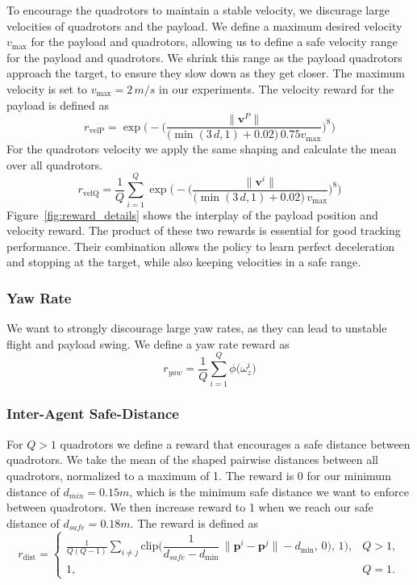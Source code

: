 To encourage the quadrotors to maintain a stable velocity, we discurage large velocities of quadrotors and the payload. We define a maximum desired velocity $v_{\max}$ for the payload and quadrotors, allowing us to define a safe velocity range for the payload and quadrotors. We shrink this range as the payload quadrotors approach the target, to ensure they slow down as they get closer. The maximum velocity is set to $v_{\max}=2\,m/s$ in our experiments. The velocity reward for the payload is defined as
\begin{equation}
r_{\mathrm{velP}}
= \exp\!\Biggl(-\biggl(\frac{\lVert \mathbf{v}^P\rVert}{\bigl(\min(3\,d,1)+0.02\bigr)\,0.75v_{\max}}\biggr)^{8}\Biggr)
\end{equation}
For the quadrotors velocity we apply the same shaping and calculate the mean over all quadrotors.
\begin{equation}
r_{\mathrm{velQ}}
= \frac{1}{Q}\sum_{i=1}^Q \exp\!\Biggl(-\biggl(\frac{\lVert \mathbf{v}^i\rVert}{\bigl(\min(3\,d,1)+0.02\bigr)\,v_{\max}}\biggr)^{8}\Biggr) 
\end{equation}
Figure~\ref{fig:reward_details} shows the interplay of the payload position and velocity reward. The product of these two rewards is essential for good tracking performance. Their combination allows the policy to learn perfect deceleration and stopping at the target, while also keeping velocities in a safe range.
\subsubsection{Yaw Rate}
We want to strongly discourage large yaw rates, as they can lead to unstable flight and payload swing. We define a yaw rate reward as
\begin{equation}
r_{yaw}
= \frac{1}{Q}\sum_{i=1}^{Q}\phi\bigl(\omega_z^i\bigr)
\end{equation}
\subsubsection{Inter-Agent Safe-Distance}
For $Q>1$ quadrotors we define a reward that encourages a safe distance between quadrotors. We take the mean of the shaped pairwise distances between all quadrotors, normalized to a maximum of 1. The reward is 0 for our minimum distance of $d_{min}= 0.15 m$, which is the minimum safe distance we want to enforce between quadrotors. We then increase reward to 1 when we reach our safe distance of $d_{safe}=0.18 m$. The reward is defined as
\begin{equation}
r_{\mathrm{dist}} =
\begin{cases}
\displaystyle
\frac{1}{Q(Q-1)} \sum_{i \neq j}
\mathrm{clip}\bigl(\dfrac{1}{d_{safe}-d_{\min}}\,\|\mathbf{p}^i - \mathbf{p}^j\| - d_{\min},\,0),\,1\bigr),
& Q > 1,\\[1.5ex]
1, & Q = 1.
\end{cases}
\end{equation}

